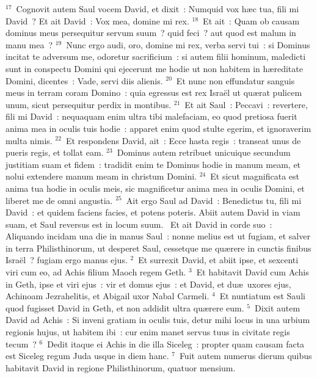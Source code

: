 ${}^{17}$~Cognovit autem Saul vocem David, et dixit~: Numquid vox h\ae c tua, fili mi David~? Et ait David~: Vox mea, domine mi rex.
${}^{18}$~Et ait~: Quam ob causam dominus meus persequitur servum suum~? quid feci~? aut quod est malum in manu mea~?
${}^{19}$~Nunc ergo audi, oro, domine mi rex, verba servi tui~: si Dominus incitat te adversum me, odoretur sacrificium~: si autem filii hominum, maledicti sunt in conspectu Domini qui ejecerunt me hodie ut non habitem in h\ae reditate Domini, dicentes~: Vade, servi diis alienis.
${}^{20}$~Et nunc non effundatur sanguis meus in terram coram Domino~: quia egressus est rex Isra\"el ut qu\ae rat pulicem unum, sicut persequitur perdix in montibus.
${}^{21}$~Et ait Saul~: Peccavi~: revertere, fili mi David~: nequaquam enim ultra tibi malefaciam, eo quod pretiosa fuerit anima mea in oculis tuis hodie~: apparet enim quod stulte egerim, et ignoraverim multa nimis.
${}^{22}$~Et respondens David, ait~: Ecce hasta regis~: transeat unus de pueris regis, et tollat eam.
${}^{23}$~Dominus autem retribuet unicuique secundum justitiam suam et fidem~: tradidit enim te Dominus hodie in manum meam, et nolui extendere manum meam in christum Domini.
${}^{24}$~Et sicut magnificata est anima tua hodie in oculis meis, sic magnificetur anima mea in oculis Domini, et liberet me de omni angustia.
${}^{25}$~Ait ergo Saul ad David~: Benedictus tu, fili mi David~: et quidem faciens facies, et potens poteris. Abiit autem David in viam suam, et Saul reversus est in locum suum.
~Et ait David in corde suo~: Aliquando incidam una die in manus Saul~: nonne melius est ut fugiam, et salver in terra Philisthinorum, ut desperet Saul, cessetque me qu\ae rere in cunctis finibus Isra\"el~? fugiam ergo manus ejus.
${}^{2}$~Et surrexit David, et abiit ipse, et sexcenti viri cum eo, ad Achis filium Maoch regem Geth.
${}^{3}$~Et habitavit David cum Achis in Geth, ipse et viri ejus~: vir et domus ejus~: et David, et du\ae\ uxores ejus, Achinoam Jezrahelitis, et Abigail uxor Nabal Carmeli.
${}^{4}$~Et nuntiatum est Sauli quod fugisset David in Geth, et non addidit ultra qu\ae rere eum.
${}^{5}$~Dixit autem David ad Achis~: Si inveni gratiam in oculis tuis, detur mihi locus in una urbium regionis hujus, ut habitem ibi~: cur enim manet servus tuus in civitate regis tecum~?
${}^{6}$~Dedit itaque ei Achis in die illa Siceleg~: propter quam causam facta est Siceleg regum Juda usque in diem hanc.
${}^{7}$~Fuit autem numerus dierum quibus habitavit David in regione Philisthinorum, quatuor mensium.


